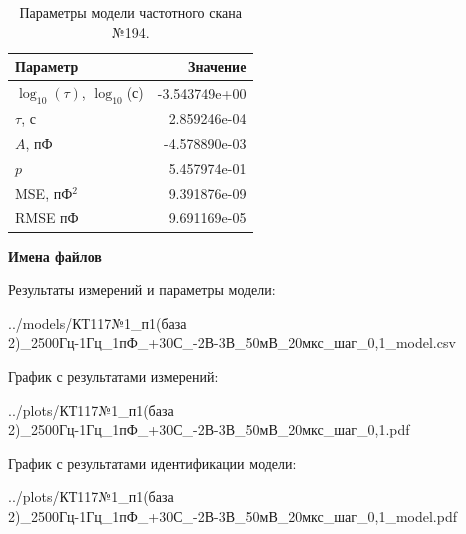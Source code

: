 \begin{table}[!ht]
    \centering
    \caption{Параметры модели частотного скана №194.}
    \begin{tabular}{|l|r|}
        \hline
        Параметр                                       & Значение                  \\ \hline
        $\log_{10}(\tau)$, $\log_{10}$(с)              & -3.543749e+00             \\ \hline
        $\tau$, с                                      & 2.859246e-04              \\ \hline
        $A$, пФ                                        & -4.578890e-03             \\ \hline
        $p$                                            & 5.457974e-01              \\ \hline
        MSE, пФ$^2$                                    & 9.391876e-09              \\ \hline
        RMSE пФ                                        & 9.691169e-05              \\ \hline
    \end{tabular}
    \label{table:frequency_scan_model_194}
\end{table}

\textbf{Имена файлов}

Результаты измерений и параметры модели:

\scriptsize../models/КТ117№1\_п1(база 2)\_2500Гц-1Гц\_1пФ\_+30С\_-2В-3В\_50мВ\_20мкс\_шаг\_0,1\_model.csv
\normalsize

График с результатами измерений:

\scriptsize../plots/КТ117№1\_п1(база 2)\_2500Гц-1Гц\_1пФ\_+30С\_-2В-3В\_50мВ\_20мкс\_шаг\_0,1.pdf
\normalsize

График с результатами идентификации модели:

\scriptsize../plots/КТ117№1\_п1(база 2)\_2500Гц-1Гц\_1пФ\_+30С\_-2В-3В\_50мВ\_20мкс\_шаг\_0,1\_model.pdf
\normalsize

